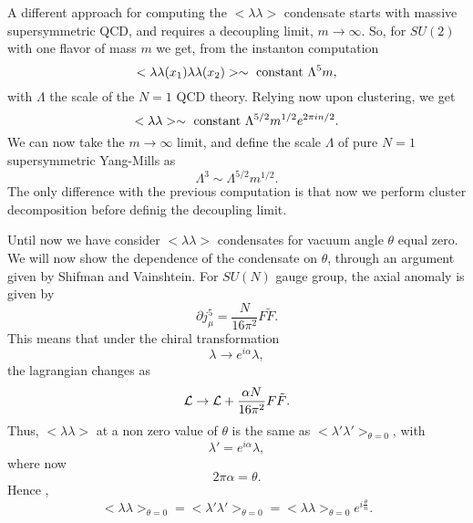A different approach for computing the $<\lambda \lambda>$
condensate starts with massive supersymmetric QCD, and requires a
decoupling limit, $m \rightarrow \infty$. So, for $SU(2)$ with
one flavor of mass $m$ we get, from the instanton computation
\begin{equation}
< \lambda \lambda(x_1) \lambda \lambda(x_2)> \sim \hbox {
constant } \Lambda^5 m,
\end{equation}
with $\Lambda$ the scale of the $N=1$ QCD theory. Relying now
upon clustering, we get
\begin{equation}
< \lambda \lambda> \sim \hbox {
constant } \Lambda^{5/2} m^{1/2} e^{2 \pi i n/2}.
\end{equation}
We can now take the $m \rightarrow \infty$ limit, and define the
scale $\Lambda$ of pure $N=1$ supersymmetric Yang-Mills as 
\begin{equation}
\Lambda^3 \sim \Lambda^{5/2} m^{1/2}.
\end{equation}
The only difference with the previous computation is that now we
perform cluster decomposition before definig the decoupling
limit.
  
Until now we have consider $<\lambda \lambda>$ condensates for
vacuum angle $\theta$ equal zero. We will now show the dependence
of the condensate on $\theta$, through an argument given by
Shifman and Vainshtein. For $SU(N)$ gauge group, the axial
anomaly is given by
\begin{equation}
\partial j_{\mu}^5 = \frac {N}{16 \pi^2} F \tilde{F}. 
\end{equation}
This means that under the chiral transformation
\begin{equation}
\lambda \rightarrow e^{i \alpha} \lambda,
\end{equation}
the lagrangian changes as
\begin{equation}
{\cal L} \rightarrow {\cal L} + \frac {\alpha  N}{16 \pi^2} F
\tilde{F}.
\end{equation}
Thus, $<\lambda \lambda>$ at a non zero value of $\theta$ is the
same as $<\lambda' \lambda'>_{\theta=0}$, with
\begin{equation}
\lambda'=e^{i \alpha} \lambda,
\end{equation}
where now 
\begin{equation}
2 \pi \alpha = \theta.
\end{equation}
Hence \cite{SV},
\begin{equation}
<\lambda \lambda>_{\theta=0} = <\lambda' \lambda'>_{\theta=0} =
<\lambda \lambda>_{\theta=0} e^{i \frac {\theta}{n}}.
\label{smi}
\end{equation}



